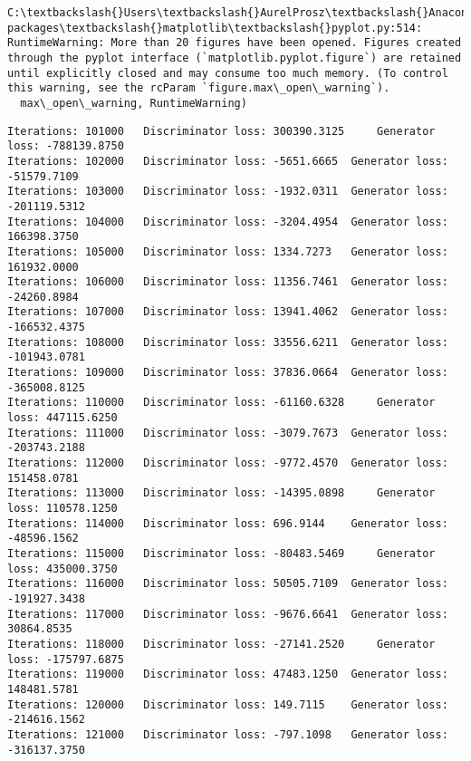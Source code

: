 \documentclass[11pt]{article}
\begin{document}
    \begin{Verbatim}[commandchars=\\\{\}]
C:\textbackslash{}Users\textbackslash{}AurelProsz\textbackslash{}Anaconda3\textbackslash{}envs\textbackslash{}keras2\textbackslash{}lib\textbackslash{}site-packages\textbackslash{}matplotlib\textbackslash{}pyplot.py:514: RuntimeWarning: More than 20 figures have been opened. Figures created through the pyplot interface (`matplotlib.pyplot.figure`) are retained until explicitly closed and may consume too much memory. (To control this warning, see the rcParam `figure.max\_open\_warning`).
  max\_open\_warning, RuntimeWarning)

    \end{Verbatim}

    \begin{Verbatim}[commandchars=\\\{\}]
Iterations: 101000	 Discriminator loss: 300390.3125	 Generator loss: -788139.8750
Iterations: 102000	 Discriminator loss: -5651.6665	 Generator loss: -51579.7109
Iterations: 103000	 Discriminator loss: -1932.0311	 Generator loss: -201119.5312
Iterations: 104000	 Discriminator loss: -3204.4954	 Generator loss: 166398.3750
Iterations: 105000	 Discriminator loss: 1334.7273	 Generator loss: 161932.0000
Iterations: 106000	 Discriminator loss: 11356.7461	 Generator loss: -24260.8984
Iterations: 107000	 Discriminator loss: 13941.4062	 Generator loss: -166532.4375
Iterations: 108000	 Discriminator loss: 33556.6211	 Generator loss: -101943.0781
Iterations: 109000	 Discriminator loss: 37836.0664	 Generator loss: -365008.8125
Iterations: 110000	 Discriminator loss: -61160.6328	 Generator loss: 447115.6250
Iterations: 111000	 Discriminator loss: -3079.7673	 Generator loss: -203743.2188
Iterations: 112000	 Discriminator loss: -9772.4570	 Generator loss: 151458.0781
Iterations: 113000	 Discriminator loss: -14395.0898	 Generator loss: 110578.1250
Iterations: 114000	 Discriminator loss: 696.9144	 Generator loss: -48596.1562
Iterations: 115000	 Discriminator loss: -80483.5469	 Generator loss: 435000.3750
Iterations: 116000	 Discriminator loss: 50505.7109	 Generator loss: -191927.3438
Iterations: 117000	 Discriminator loss: -9676.6641	 Generator loss: 30864.8535
Iterations: 118000	 Discriminator loss: -27141.2520	 Generator loss: -175797.6875
Iterations: 119000	 Discriminator loss: 47483.1250	 Generator loss: 148481.5781
Iterations: 120000	 Discriminator loss: 149.7115	 Generator loss: -214616.1562
Iterations: 121000	 Discriminator loss: -797.1098	 Generator loss: -316137.3750

\end{Verbatim}
\end{document}
